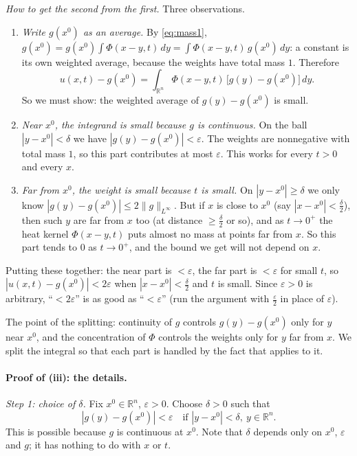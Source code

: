 \documentclass[11pt]{article}
\theoremstyle{plain}
\theoremstyle{definition}
\theoremstyle{remark}
\begin{document}
\emph{How to get the second from the first.} Three observations.
\begin{enumerate}
    \item \emph{Write $g(x^0)$ as an average.} By \eqref{eq:mass1}, $g(x^0) = g(x^0)\int\Phi(x - y,t)\,dy = \int\Phi(x - y,t)\,g(x^0)\,dy$: a constant is its own weighted average, because the weights have total mass $1$. Therefore
    $$ u(x,t) - g(x^0) = \int_{\mathbb{R}^n}\Phi(x-y,t)\,\big[g(y) - g(x^0)\big]\, dy. $$
    So we must show: the weighted average of $g(y) - g(x^0)$ is small.
    \item \emph{Near $x^0$, the integrand is small because $g$ is continuous.} On the ball $|y - x^0| < \delta$ we have $|g(y) - g(x^0)| < \varepsilon$. The weights are nonnegative with total mass $1$, so this part contributes at most $\varepsilon$. This works for every $t > 0$ and every $x$.
    \item \emph{Far from $x^0$, the weight is small because $t$ is small.} On $|y - x^0| \geq \delta$ we only know $|g(y) - g(x^0)| \leq 2\|g\|_{L^\infty}$. But if $x$ is close to $x^0$ (say $|x - x^0| < \frac\delta2$), then such $y$ are far from $x$ too (at distance $\ge \frac{\delta}{2}$ or so), and as $t \to 0^+$ the heat kernel $\Phi(x-y,t)$ puts almost no mass at points far from $x$. So this part tends to $0$ as $t \to 0^+$, and the bound we get will not depend on $x$.
\end{enumerate}
Putting these together: the near part is $< \varepsilon$, the far part is $< \varepsilon$ for small $t$, so $|u(x,t) - g(x^0)| < 2\varepsilon$ when $|x - x^0| < \frac{\delta}{2}$ and $t$ is small. Since $\varepsilon > 0$ is arbitrary, ``$< 2\varepsilon$'' is as good as ``$< \varepsilon$'' (run the argument with $\frac\varepsilon2$ in place of $\varepsilon$).

The point of the splitting: continuity of $g$ controls $g(y) - g(x^0)$ only for $y$ near $x^0$, and the concentration of $\Phi$ controls the weights only for $y$ far from $x$. We split the integral so that each part is handled by the fact that applies to it.

\paragraph{Proof of (iii): the details.}

\emph{Step 1: choice of $\delta$.} Fix $x^0 \in \mathbb{R}^n$, $\varepsilon > 0$. Choose $\delta > 0$ such that
\begin{equation}\label{eq:gcont}
|g(y) - g(x^0)| < \varepsilon \quad \text{if } |y - x^0| < \delta,\ y \in \mathbb{R}^n.
\end{equation}
This is possible because $g$ is continuous at $x^0$. Note that $\delta$ depends only on $x^0$, $\varepsilon$ and $g$; it has nothing to do with $x$ or $t$.
\end{document}

